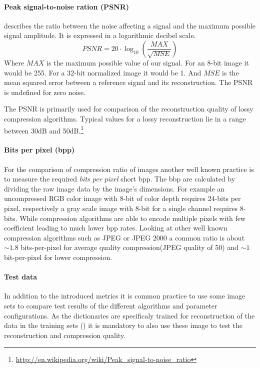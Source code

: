 \paragraph{Peak signal-to-noise ration (PSNR)} describes the ratio between the
noise affecting a signal and the maximum possible signal amplitude. It is
expressed in a logarithmic decibel scale.
\begin{equation*}
 PSNR = 20 \cdot \log_{10} \left(\frac{MAX}{\sqrt{MSE}}\right)
\end{equation*}
Where $MAX$ is the maximum possible value of our signal. For an 8-bit
image it would be 255. For a 32-bit normalized image it would be 1. And $MSE$ is
the mean squared error between a reference signal and its reconstruction. The
PSNR is undefined for zero noise.

The PSNR is primarily used for comparison of the reconstruction quality of
lossy compression algorithms. Typical values for a lossy reconstruction lie in
a range between 30dB and
50dB.\footnote{\url{http://en.wikipedia.org/wiki/Peak_signal-to-noise_ratio}}

\paragraph{Bits per pixel (bpp)} 
For the comparison of compression ratio of images another well known practice is
to measure the required \emph{bits per pixel} short bpp. The bbp are calculated
by dividing the raw image data by the image's dimensions. For example an
uncompressed RGB color image with 8-bit of color depth requires 24-bits per
pixel, respectively a gray scale image with 8-bit for a single channel requires
8-bits. While compression algorithms are able to encode multiple pixels with few
coefficient leading to much lower bpp rates.
Looking at other well known compression algorithms such as JPEG or
JPEG 2000 a common ratio is about $\sim1.8$ bits-per-pixel for average
quality compression(JPEG quality of 50) and $\sim1$ bit-per-pixel for lower
compression.


\paragraph{Test data}
In addition to the introduced metrics it is common practice to use some image
sets to compare test results of the different algorithms and parameter
configurations. As the dictionaries are specificaly trained for
reconstruction of the data in the training sets
() it is mandatory to also use
these image to test the reconstruction and
compression quality. 

